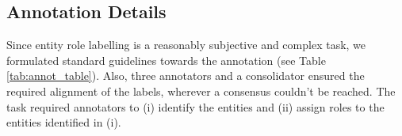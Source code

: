 \documentclass[11pt]{article}
\newcommand{\dataset}{\textcolor{black}{\texttt{HVVMemes}}}
\begin{document}
 
\begin{table}[t!]
\centering
\caption{Statistics of our proposed \dataset\ dataset.}
\label{tab:dataset_summary}
\end{table}
\fi







\subsection{Annotation Details} Since entity role labelling is a reasonably subjective and complex task, we formulated standard guidelines towards the annotation (see Table \ref{tab:annot_table}). Also, three annotators and a consolidator ensured the required alignment of the labels, wherever a consensus couldn't be reached. The task required annotators to (i) identify the entities and (ii) assign roles to the entities identified in (i). 
\end{document}
